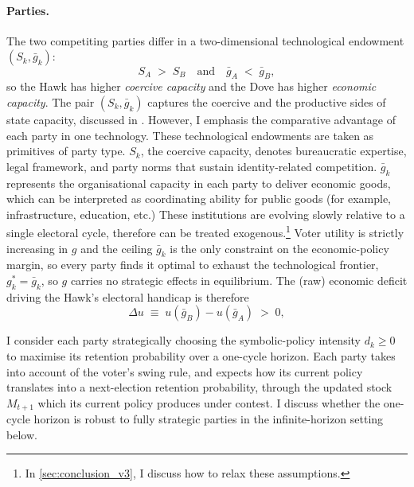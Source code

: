 \documentclass[11pt,twoside]{extarticle}
\begin{document}
\paragraph{Parties.} The two competiting parties differ in a two-dimensional technological endowment $(S_k,\bar g_k)$:
\begin{equation}\label{eq:party_endowment_v3}
    S_A\;>\;S_B\quad\text{and}\quad\bar g_A\;<\;\bar g_B,
\end{equation}
so the Hawk has higher \emph{coercive capacity} and the Dove has higher \emph{economic capacity}. The pair $(S_k,\bar g_k)$ captures the coercive and the productive sides of state capacity, discussed in \citet*{besleyOriginsStateCapacity2009,besleyStateCapacityConflict2010}. However, I emphasis the comparative advantage of each party in one technology.
These technological endowments are taken as primitives of party type. $S_k$, the coercive capacity, denotes bureaucratic expertise, legal framework, and party norms that sustain identity-related competition. 
$\bar g_k$ represents the organisational capacity in each party to deliver economic goods, which can be interpreted as coordinating ability for public goods (for example, infrastructure, education, etc.)  
These institutions are evolving slowly relative to a single electoral cycle, therefore can be treated exogenous.\footnote{In \autoref{sec:conclusion_v3}, I discuss how to relax these assumptions.}  
Voter utility is strictly increasing in $g$ and the ceiling $\bar g_k$ is the only constraint on the economic-policy margin, so every party finds it optimal to exhaust the technological frontier, $g_k^*=\bar g_k$, so $g$ carries no strategic effects in equilibrium. The (raw) economic deficit driving the Hawk's electoral handicap is therefore
\begin{equation}\label{eq:du_v3}
    \Delta u\;\equiv\;u(\bar g_B)-u(\bar g_A)\;>\;0,
\end{equation}

I consider each party strategically choosing the symbolic-policy intensity $d_k\ge 0$ to maximise its retention probability over a one-cycle horizon. 
Each party takes into account of the voter's swing rule, and expects how its current policy translates into a next-election retention probability, through the updated stock $M_{t+1}$ which its current policy produces under contest. 
I discuss whether the one-cycle horizon is robust to fully strategic parties in the infinite-horizon setting below.
\end{document}
